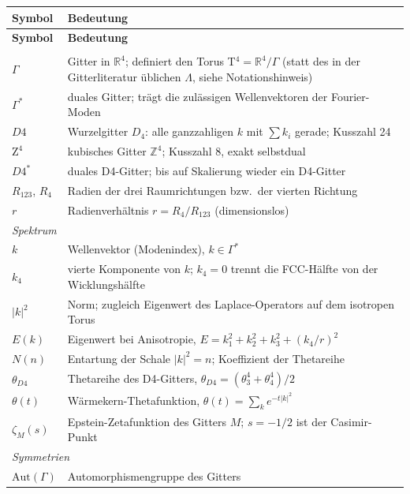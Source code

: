 \documentclass[11pt]{report}
\begin{document}
\begin{center}
\renewcommand{\arraystretch}{1.3}
{\small\setlength\tabcolsep{5pt}
\begin{longtable}{lp{9.6cm}}
\toprule
\textbf{Symbol} & \textbf{Bedeutung} \\
\midrule
\endfirsthead
\toprule
\textbf{Symbol} & \textbf{Bedeutung} \\
\midrule
\endhead
\bottomrule
\endfoot
\multicolumn{2}{l}{\textit{Gitter und Torus}} \\
$\Gamma$ & Gitter in $\mathbb{R}^4$; definiert den Torus
  T$^4 = \mathbb{R}^4/\Gamma$ (statt des in der Gitterliteratur
  üblichen $\Lambda$, siehe Notationshinweis) \\
$\Gamma^{*}$ & duales Gitter; trägt die zulässigen Wellenvektoren
  der Fourier-Moden \\
$D4$ & Wurzelgitter $D_4$: alle ganzzahligen $k$ mit
  $\sum k_i$ gerade; Kusszahl 24 \\
$\text{Z}^4$ & kubisches Gitter $\mathbb{Z}^4$; Kusszahl 8,
  exakt selbstdual \\
$D4^{*}$ & duales D4-Gitter; bis auf Skalierung wieder ein
  D4-Gitter \\
$R_{123}$, $R_4$ & Radien der drei Raumrichtungen bzw.\ der
  vierten Richtung \\
$r$ & Radienverhältnis $r = R_4/R_{123}$ (dimensionslos) \\
\midrule
\multicolumn{2}{l}{\textit{Spektrum}} \\
$k$ & Wellenvektor (Modenindex), $k \in \Gamma^{*}$ \\
$k_4$ & vierte Komponente von $k$; $k_4 = 0$ trennt die
  FCC-Hälfte von der Wicklungshälfte \\
$|k|^2$ & Norm; zugleich Eigenwert des Laplace-Operators auf dem
  isotropen Torus \\
$E(k)$ & Eigenwert bei Anisotropie,
  $E = k_1^2+k_2^2+k_3^2+(k_4/r)^2$ \\
$N(n)$ & Entartung der Schale $|k|^2 = n$; Koeffizient der
  Thetareihe \\
$\theta_{D4}$ & Thetareihe des D4-Gitters,
  $\theta_{D4} = (\theta_3^4+\theta_4^4)/2$ \\
$\theta(t)$ & Wärmekern-Thetafunktion, $\theta(t) = \sum_k
  e^{-t|k|^2}$ \\
$\zeta_M(s)$ & Epstein-Zetafunktion des Gitters $M$;
  $s = -1/2$ ist der Casimir-Punkt \\
\midrule
\multicolumn{2}{l}{\textit{Symmetrien}} \\
$\text{Aut}(\Gamma)$ & Automorphismengruppe des Gitters

\end{longtable}}
\end{center}
\end{document}
